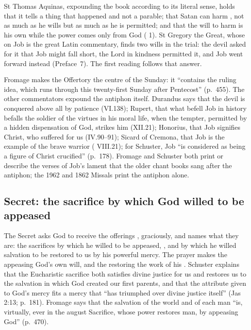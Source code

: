 St Thomas Aquinas, expounding the book according to its literal sense, holds
that it tells a thing that happened and not a parable; that Satan can harm
, not as much as he wills but as
much as he is permitted; and that the will to harm is his own while the power
comes only from God ( 1). St Gregory the Great, whose
 on Job is the great Latin commentary, finds two wills in the
trial: the devil asked for it that Job might fall short, the Lord in kindness
permitted it, and Job went forward instead (Preface~7). The first reading follows that answer.

Fromage makes the Offertory the centre of the Sunday: it ``contains the ruling
idea, which runs through this twenty-first Sunday after Pentecost'' (p.~455). The
other commentators expound the antiphon itself. Durandus says that the devil is
conquered above all by patience (VI.138); Rupert, that what befell Job in history
befalls the soldier of the virtues in his moral life, when the tempter, permitted
by a hidden dispensation of God, strikes him (XII.21); Honorius, that Job
signifies Christ, who suffered for us (IV.90--91); Sicard of Cremona, that Job is
the example of the brave warrior ( VIII.21); for Schuster, Job ``is
considered as being a figure of Christ crucified'' (p.~178). Fromage and Schuster both print or describe the
verses of Job's lament that the older chant books sang after the antiphon; the
1962 and 1862 Missals print the antiphon alone.

\subsection{Secret: the sacrifice by which God willed to be appeased}

The Secret asks God to receive the offerings , graciously, and
names what they are: the sacrifices by which he willed to be appeased,
, and by which he willed salvation to be
restored to us by his powerful mercy. The prayer makes the appeasing God's own
will, and the restoring the work of his . Schuster explains that
the Eucharistic sacrifice both satisfies divine justice for us and restores us
to the salvation in which God created our first parents, and that the attribute
 given to God's mercy fits a mercy that ``has triumphed over divine
justice itself'' (Jas 2:13; p.~181). Fromage says that the salvation of the
world and of each man ``is, virtually, ever in the august Sacrifice, whose power
restores man, by appeasing God'' (p.~470).

